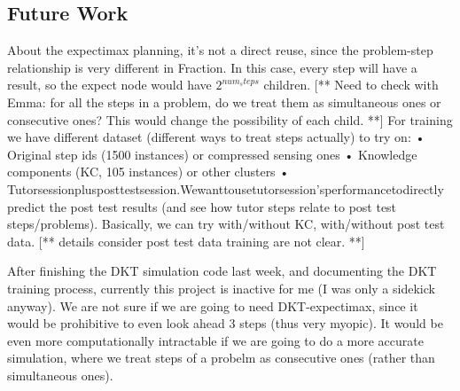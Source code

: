 \subsection{Future Work}
About the expectimax planning, it’s not a direct reuse, since the problem-step relationship is very different in Fraction. In this case, every step will have a result, so the expect node would have $2^{num_steps}$ children. [** Need to check with Emma: for all the steps in a problem, do we treat them as simultaneous ones or consecutive ones? This would change the possibility of each child. **]
For training we have different dataset (different ways to treat steps actually) to try on:
• Original step ids (1500 instances) or compressed sensing ones
• Knowledge components (KC, 105 instances) or other clusters
• Tutorsessionplusposttestsession.Wewanttousetutorsession’sperformancetodirectly predict the post test results (and see how tutor steps relate to post test steps/problems).
Basically, we can try with/without KC, with/without post test data. [** details consider post test data training are not clear. **]


After finishing the DKT simulation code last week, and documenting the DKT training process, currently this project is inactive for me (I was only a sidekick anyway). We are not sure if we are going to need DKT-expectimax, since it would be prohibitive to even look ahead 3 steps (thus very myopic). It would be even more computationally intractable if we are going to do a more accurate simulation, where we treat steps of a probelm as consecutive ones (rather than simultaneous ones).
